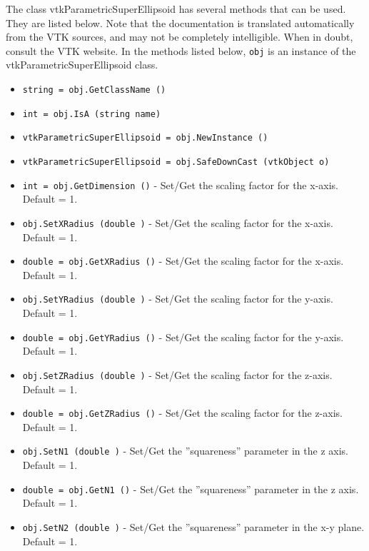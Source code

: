 The class vtkParametricSuperEllipsoid has several methods that can be used.
  They are listed below.
Note that the documentation is translated automatically from the VTK sources,
and may not be completely intelligible.  When in doubt, consult the VTK website.
In the methods listed below, \verb|obj| is an instance of the vtkParametricSuperEllipsoid class.
\begin{itemize}
\item  \verb|string = obj.GetClassName ()|

\item  \verb|int = obj.IsA (string name)|

\item  \verb|vtkParametricSuperEllipsoid = obj.NewInstance ()|

\item  \verb|vtkParametricSuperEllipsoid = obj.SafeDownCast (vtkObject o)|

\item  \verb|int = obj.GetDimension ()| -  Set/Get the scaling factor for the x-axis. Default = 1.

\item  \verb|obj.SetXRadius (double )| -  Set/Get the scaling factor for the x-axis. Default = 1.

\item  \verb|double = obj.GetXRadius ()| -  Set/Get the scaling factor for the x-axis. Default = 1.

\item  \verb|obj.SetYRadius (double )| -  Set/Get the scaling factor for the y-axis. Default = 1.

\item  \verb|double = obj.GetYRadius ()| -  Set/Get the scaling factor for the y-axis. Default = 1.

\item  \verb|obj.SetZRadius (double )| -  Set/Get the scaling factor for the z-axis. Default = 1.

\item  \verb|double = obj.GetZRadius ()| -  Set/Get the scaling factor for the z-axis. Default = 1.

\item  \verb|obj.SetN1 (double )| -  Set/Get the ''squareness'' parameter in the z axis.  Default = 1.

\item  \verb|double = obj.GetN1 ()| -  Set/Get the ''squareness'' parameter in the z axis.  Default = 1.

\item  \verb|obj.SetN2 (double )| -   Set/Get the ''squareness'' parameter in the x-y plane. Default = 1.


\end{itemize}

